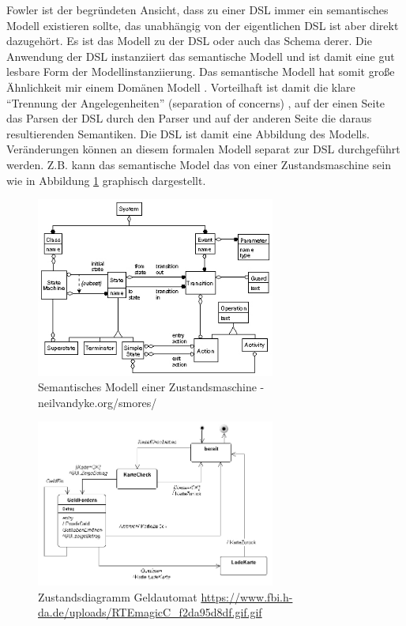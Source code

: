 \documentclass[11pt,english,ngerman, headsepline]{scrreprt}
\begin{document}
Fowler ist der begründeten Ansicht, dass zu einer DSL immer ein semantisches
Modell \cite[p. 159]{fowler2011domain} existieren sollte, das unabhängig von
der eigentlichen DSL ist aber direkt dazugehört. Es ist das Modell zu der DSL 
oder auch das Schema derer. Die Anwendung der DSL instanziiert das semantische
Modell und ist damit eine gut lesbare Form der Modellinstanziierung. Das semantische Modell hat somit
große Ähnlichkeit mir einem Domänen Modell \cite[]{fowler2003patterns}.
Vorteilhaft ist damit die klare ``Trennung der Angelegenheiten'' (separation of
concerns) \cite{Huersch95separationof}, auf der einen Seite das Parsen der DSL
durch den Parser und auf der anderen Seite die daraus resultierenden Semantiken.
Die DSL ist damit eine Abbildung des Modells. Veränderungen können an diesem
formalen Modell separat zur DSL durchgeführt werden. Z.B. kann das semantische
Model das von einer Zustandsmaschine sein wie in Abbildung
\ref{state-machine-semantic-model} graphisch dargestellt.


\begin{figure}[h!]
	\begin{center}
	\includegraphics[width=0.7\textwidth]{pics/data-model.jpg}
	\end{center}
	\caption{Semantisches Modell einer 	Zustandsmaschine
	- neilvandyke.org/smores/ }
	\label{state-machine-semantic-model}
\end{figure}

\begin{figure}[h!]
	\begin{center}
	\includegraphics[width=0.7\textwidth]{pics/zutandsdiaGeldautomat.jpg}
	\end{center}
	\caption{Zustandsdiagramm Geldautomat
	\url{https://www.fbi.h-da.de/uploads/RTEmagicC_f2da95d8df.gif.gif} }
	\label{zutandsdiaGeldautomat.jpg}
\end{figure}
\end{document}
